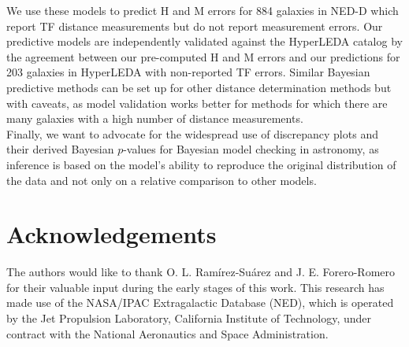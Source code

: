 \documentclass[a4paper,fleqn,usenatbib]{mnras}
\begin{document}
We use these models to predict H and M errors for 884 galaxies in NED-D which report TF distance measurements but do not report measurement errors. Our predictive models are independently validated against the HyperLEDA catalog by the agreement between our pre-computed H and M errors and our predictions for 203 galaxies in HyperLEDA with non-reported TF errors. Similar Bayesian predictive methods can be set up for other distance determination methods but with caveats, as model validation works better for methods for which there are many galaxies with a high number of distance measurements.\\ 

Finally, we want to advocate for the widespread use of discrepancy plots and their derived Bayesian $p$-values for  Bayesian model checking in astronomy, as inference is based on the model's ability to reproduce the original distribution of the data and not only on a relative comparison to other models.

\section*{Acknowledgements}

The authors would like to thank O. L. Ram\'irez-Su\'arez and J. E. Forero-Romero for their valuable input during the early stages of this work. This research has made use of the NASA/IPAC Extragalactic Database (NED), which is operated by the Jet Propulsion Laboratory, California Institute of Technology, under contract with the National Aeronautics and Space Administration.







\end{document}
